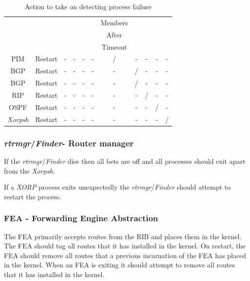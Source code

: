 \documentclass[11pt]{article}
\makeatletter
\newcommand{\xorp} {{\em XORP}\@\xspace}
\newcommand{\finder} {{\em Finder}\@\xspace}
\newcommand{\xorpsh} {{\em Xorpsh}\@\xspace}
\newcommand{\rtrmgr} {{\em rtrmgr}\@\xspace}
\makeatother
\begin{document}
\begin{table}[ht]
\begin{center}
\begin{tabular}{|c|c|c|c|c|c|c|c|c|c|c|}
                &                 &          &      &      &      & Members &      &      &      &         \\
                &                 &          &      &      &      & After   &      &      &      &         \\
                &                 &          &      &      &      & Timeout &      &      &      &         \\\hline
PIM             &  Restart        & -        & -    & -    & -    & /       & -    & -    & -    & -       \\\hline
BGP             &  Restart        & -        & -    & -    & -    & -       & /    & -    & -    & -       \\\hline
BGP             &  Restart        & -        & -    & -    & -    & -       & /    & -    & -    & -       \\\hline
RIP             &  Restart        & -        & -    & -    & -    & -       & -    & /    & -    & -       \\\hline
OSPF            &  Restart        & -        & -    & -    & -    & -       & -    & -    & /    & -       \\\hline
\xorpsh         &  Restart        & -        & -    & -    & -    & -       & -    & -    & -    & /       \\\hline
\end{tabular}
\end{center}
\caption{\label{failure_table}Action to take on detecting process failure}
\end{table}

\subsubsection{\rtrmgr/\finder - Router manager}

If the \rtrmgr/\finder dies then all bets are off and all processes
should exit apart from the \xorpsh.

If a \xorp process exits unexpectedly the \rtrmgr/\finder should
attempt to restart the process.

\subsubsection{FEA - Forwarding Engine Abstraction}

The FEA primarily accepts routes from the RIB and places them in the
kernel. The FEA should tag all routes that it has installed in the
kernel.  On restart, the FEA should remove all routes that a previous
incarnation of the FEA has placed in the kernel. When an FEA is
exiting it should attempt to remove all routes that it has installed
in the kernel.
\end{document}
